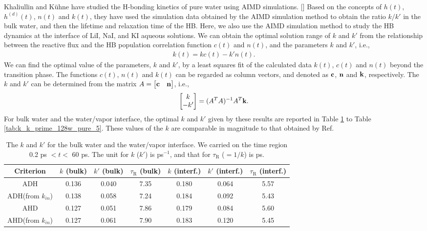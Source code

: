 Khaliullin and K\"uhne have studied the H-bonding kinetics of pure water using AIMD simulations. [\cite{Khaliullin2013}]
Based on the concepts of $h(t)$, $h^{(d)}(t)$, $n(t)$ and $k(t)$, they have used the simulation data 
obtained by the AIMD simulation method to obtain the ratio $k/k'$ in the bulk water, and then the lifetime and relaxation time 
of the HB.  Here, we also use the AIMD simulation method to study the HB dynamics at the interface of LiI, NaI, and KI aqueous 
solutions. We can obtain the optimal solution range of $k$ and $k'$ from the relationship 
between the reactive flux and the HB population correlation function $c(t)$ and $n(t)$, and the parameters $k$ and $k'$, i.e.,
\begin{eqnarray}
  k(t) = kc(t)-k'n(t).
\label{eq:fitting_k_rates}
\end{eqnarray}
%
We can find the optimal value of the parameters, $k$ and $k'$, 
by a least squares fit of the calculated data $k(t)$, $c(t)$ and $n(t)$ beyond the transition phase.  
The functions $c(t)$, $n(t)$ and $k(t)$ can be regarded as column vectors, and denoted as ${\bf c}$, ${\bf n}$ and ${\bf k}$, respectively. 
The $k$ and $k'$ can be determined from the matrix $A = \begin{bmatrix} {\bf c} & {\bf n} \end{bmatrix}$, i.e., 
\begin{equation}
\begin{bmatrix} k\\ -k' \end{bmatrix} = (A^T A)^{-1} A^T {\bf k}. 
\end{equation}
For bulk water and the water/vapor interface, the optimal $k$ and $k'$ given by these results are reported in Table 
\ref{tab:k_k_prime_128w_pure_1} to Table \ref{tab:k_k_prime_128w_pure_5}. 
These values of the $k$ are comparable in magnitude to that obtained by Ref.%
\begin{table}[htbp]
\centering
\caption{\label{tab:k_k_prime_128w_pure_1} 
    The $k$ and $k'$ for the bulk water and the water/vapor interface. We carried on the time region 0.2 ps $< t <$ 60 ps. 
The unit for $k$ ($k'$) is ps$^{-1}$, and that for $\tau_{\text{R}}$ ($=1/k$) is ps.} 
\begin{tabular}{ccccccc}
 Criterion & $k$  (bulk) & $k'$ (bulk) & $\tau_{\text{R}}$ (bulk) & $k$  (interf.) & $k'$ (interf.) & $\tau_{\text{R}}$ (interf.)\\
\hline
  ADH & 0.136 & 0.040 & 7.35 & 0.180 & 0.064 & 5.57  \\
  ADH(from $k_{in}$) & 0.138  & 0.058 & 7.24  & 0.184 & 0.092 & 5.43 \\
  AHD & 0.127 & 0.051 & 7.86 & 0.179  & 0.084 & 5.60\\
  AHD(from $k_{in}$) & 0.127  & 0.061 & 7.90 & 0.183  & 0.120 & 5.45 \\
\end{tabular}
\end{table}


